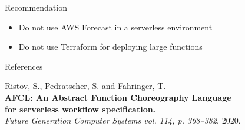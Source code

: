 \documentclass[11pt,t,usepdftitle=false,aspectratio=169]{beamer}
\begin{document}
\begin{frame}{Recommendation}
  \begin{itemize}
      \item Do not use AWS Forecast in a serverless environment
      \item Do not use Terraform for deploying large functions
  \end{itemize}
\end{frame}




\begingroup

\begin{frame}{References}
  {\footnotesize

  \begin{minipage}[t]{1\textwidth}
    Ristov, S., Pedratscher, S. and Fahringer, T. \\
    \textbf{AFCL: An Abstract Function Choreography Language \\ for serverless workflow specification.} \\
    \textit{Future Generation Computer Systems vol. 114, p. 368--382}, 2020.
    \vspace{1cm}
  \end{minipage}
  }
\end{frame}


\endgroup
\end{document}
